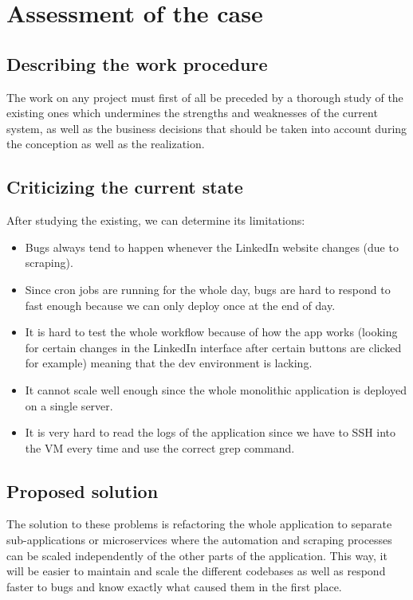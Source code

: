 \section{Assessment of the case}
\subsection{Describing the work procedure}
The work on any project must first of all be preceded by a thorough study of the existing ones which undermines the strengths and weaknesses of the current system, as well as the business decisions that should be taken into account during the conception as well as the realization.
\subsection{Criticizing the current state}
After studying the existing, we can determine its limitations:
\begin{itemize}
    \item Bugs always tend to happen whenever the LinkedIn website changes (due to scraping).
    \item Since cron jobs are running for the whole day, bugs are hard to respond to fast enough because we can only deploy once at the end of day.
    \item It is hard to test the whole workflow because of how the app works (looking for certain changes in the LinkedIn interface after certain buttons are clicked for example) meaning that the dev environment is lacking.
    \item It cannot scale well enough since the whole monolithic application is deployed on a single server.
    \item It is very hard to read the logs of the application since we have to SSH into the VM every time and use the correct grep command.
\end{itemize}
\subsection{Proposed solution}
The solution to these problems is refactoring the whole application to separate sub-applications or microservices where the automation and scraping processes can be scaled independently of the other parts of the application.
This way, it will be easier to maintain and scale the different codebases as well as respond faster to bugs and know exactly what caused them in the first place.

